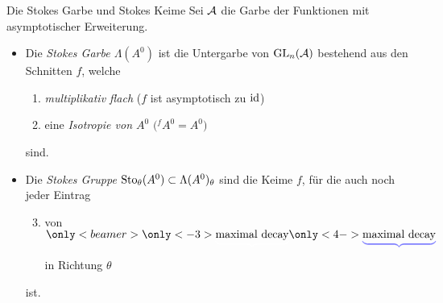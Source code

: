 \begin{frame}{Die Stokes Garbe und Stokes Keime}
  Sei $\mathcal{A}$ die Garbe der Funktionen mit asymptotischer Erweiterung.
  \begin{defn}
    \begin{itemize}
    \item Die \emph{Stokes Garbe \boldmath$\Lambda(A^0)$} ist die Untergarbe
      von $\operatorname{GL}_n(\mathcal{A})$ bestehend aus den Schnitten $f$, welche
      \begin{enumerate}
      \item\emph{multiplikativ flach} ($f$ ist asymptotisch zu $\operatorname{id}$)
      \item<2-> eine \emph{Isotropie von \boldmath$A^0$} $\bigl({}^fA^0=A^0\bigr)$
      \end{enumerate}
      sind.
    \item<3-> Die \emph{Stokes Gruppe} $\operatorname{Sto}_\theta(A^0)\subset\Lambda(A^0)_\theta$
      sind die Keime $f$, für die auch noch jeder Eintrag
      \begin{enumerate}
        \setcounter{enumi}{2}
      \item von
        \emph{$\underset{\tikzmarkt{e2}}{%
            \only<beamer>{
              \only<-3>{%
                \textcolor{white}{\underbrace{\text{%
                      \textcolor{black}{maximal decay}}}}
              }
            }
            \only<4->{%
              \textcolor{blue!50!white}{\underbrace{\text{%
                    \textcolor{black}{maximal decay}}}}
            }
          }$
        }
        in Richtung $\theta$
      \end{enumerate}
      ist.
    \end{itemize}
  \end{defn}
\end{frame}


